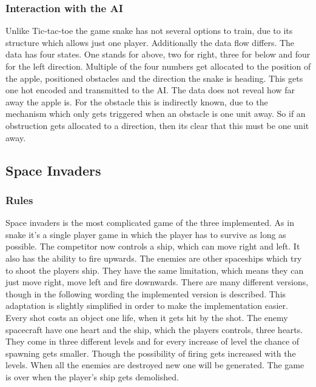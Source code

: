 \documentclass[12pt]{article}
\begin{document}
\subsubsection{Interaction with the AI}
Unlike Tic-tac-toe the game snake has not several options to train, due to its structure which allows just one player. Additionally the data flow differs. The data has four \glspl{state}. One stands for above, two for right, three for below and four for the left direction. Multiple of the four numbers get allocated to the position of the apple, positioned obstacles and the direction the snake is heading. This gets one hot encoded and transmitted to the \gls{AI}. The data does not reveal how far away the apple is. For the obstacle this is indirectly known, due to the mechanism which only gets triggered when an obstacle is one unit away. So if an obstruction gets allocated to a direction, then its clear that this must be one unit away. 
\subsection{Space Invaders}
\subsubsection{Rules}
Space invaders is the most complicated game of the three implemented. As in snake it's a single player game in which the player has to survive as long as possible. The competitor now controls a ship, which can move right and left. It also has the ability to fire upwards. The enemies are other spaceships which try to shoot the players ship. They have the same limitation, which means they can just move right, move left and fire downwards. There are many different versions, though in the following wording the implemented version is described. This adaptation is slightly simplified in order to make the implementation easier. Every shot costs an object one life, when it gets hit by the shot. The enemy spacecraft have one heart and the ship, which the players controls, three hearts. They come in three different levels and for every increase of level the chance of spawning gets smaller. Though the possibility of firing gets increased with the levels. When all the enemies are destroyed new one will be generated. The game is over when the player's ship gets demolished.
\end{document}
